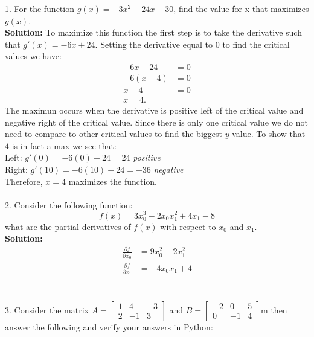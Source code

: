 \documentclass[a4paper]{article}
\begin{document}
1. For the function $g(x) = -3x^2+24x-30$, find the value for x
that maximizes $g(x)$.  
\smallskip
\\
\indent \textbf{Solution:} To maximize this function the first step
is to take the derivative such that $g'(x) = -6x+24$. Setting
the derivative equal to 0 to find the critical values we have:
\begin{align*}
-6x+24&=0 \\
-6(x-4)&=0\\
x-4&=0\\
x=4.
\end{align*}
The maximun occurs when the derivative is positive left of the
critical value and negative right of the critical value. Since
there is only one critical value we do not need to compare to 
other critical values to find the biggest $y$ value.
To show that $4$ is in fact a max we see that:\\
\indent Left: $g'(0)=-6(0)+24=24$ \textit{positive} \\
\indent Right: $g'(10)=-6(10)+24=-36$ \textit{negative} \\
Therefore, $x=4$ maximizes the function.
\\
\\
2. Consider the following function:
\begin{equation*}
f(x)=3x_0^3-2x_0x_1^2+4x_1-8
\end{equation*}
what are the partial derivatives of $f(x)$ with respect to $x_0$ and $x_1$.
\\
\textbf{Solution:}
\\
\begin{align*}
\frac{\partial f}{\partial x_0}&= 9x^2_0-2x_1^2 \\
\frac{\partial f}{\partial x_1}&= -4x_0x_1+4
\end{align*}
\\
\\
3. Consider the matrix
$ A=\left[\begin{matrix}
1 & 4 & -3 \\
2 & -1 & 3
\end{matrix}\right] $ and
$ B=\left[\begin{matrix}
-2 & 0 & 5 \\
0 & -1 & 4
\end{matrix}\right] $m then answer the following and verify your answers in Python:
\end{document}
